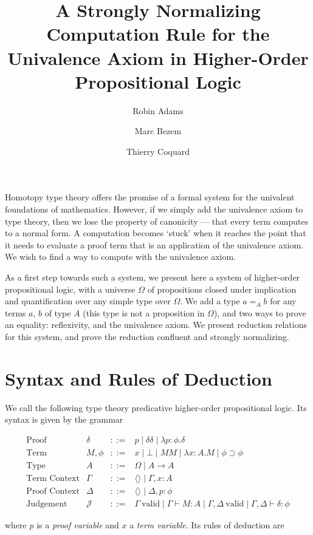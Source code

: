\documentclass{easychair}
\title{A Strongly Normalizing Computation Rule for the Univalence Axiom in Higher-Order Propositional Logic}
\author{Robin Adams\inst{1} \and Marc Bezem\inst{1} \and Thierry Coquard\inst{2}}
\institute{Universitetet i Bergen,
Bergen, Norway \\
\email{\{robin.adams,marc\}@uib.no}
\and
University of Gothenburg,
Gothenburg, Sweden \\
\email{coquand@chalmers.se}}
\newcommand{\vald}{\ \mathrm{valid}}
\begin{document}
\maketitle

Homotopy type theory offers the promise of a formal system for the univalent foundations of mathematics.  However, if
we simply add the univalence axiom to type theory, then we lose the property of canonicity --- that every term computes to
a normal form.  A computation becomes `stuck' when it reaches the point that it needs to evaluate a proof term
that is an application of the univalence axiom.  We wish to find a way to compute with the univalence axiom.

As a first step towards such a system, we present here a system of higher-order propositional logic,  with a universe $\Omega$ of propositions
closed under implication and quantification over any simple type over $\Omega$.  We add a type $a =_A b$ for any terms $a$, $b$ of type $A$
(this type is not a proposition in $\Omega$), and two ways to prove an equality: reflexivity, and the univalence axiom.  We present
reduction relations for this system, and prove the reduction confluent and strongly normalizing.

\section{Syntax and Rules of Deduction}

We call the following type theory predicative higher-order propositional logic.  Its syntax is given by the grammar

\[ \begin{array}{lrcl}
\text{Proof} & \delta & ::= & p \mid \delta \delta \mid \lambda p : \phi . \delta \\
\text{Term} & M, \phi & ::= & x \mid \bot \mid M M \mid \lambda x : A . M \mid \phi \supset \phi \\
\text{Type} & A & ::= & \Omega \mid A \rightarrow A \\
\text{Term Context} & \Gamma & ::= & \langle \rangle \mid \Gamma , x : A \\
\text{Proof Context} & \Delta & ::= & \langle \rangle \mid \Delta, p : \phi \\
\text{Judgement} & \mathcal{J} & ::= & \Gamma \vald \mid \Gamma \vdash M : A \mid \Gamma, \Delta \vald \mid \Gamma, \Delta \vdash \delta : \phi 
\end{array} \]

where $p$ is a \emph{proof variable} and $x$ a \emph{term variable}.  Its rules of deduction are
\end{document}
